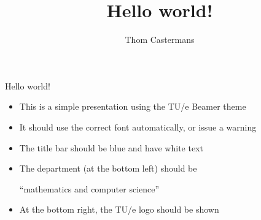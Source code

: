 \documentclass[12pt, aspectratio=169]{beamer}
\title{Hello world!}
\author{Thom Castermans}
\begin{document}
\begin{frame}{Hello world!}
  \begin{itemize}
    \item This is a simple presentation using the TU/e Beamer theme
    \item It should use the correct font automatically, or issue a warning
    \item The title bar should be blue and have white text
    \item The department (at the bottom left) should be
          
          ``mathematics and computer science''
    \item At the bottom right, the TU/e logo should be shown
  \end{itemize}
\end{frame}
\end{document}
